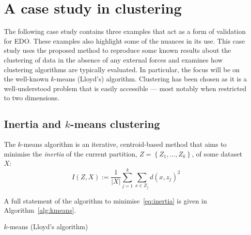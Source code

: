 

\section{A case study in clustering}\label{sec:examples}

The following case study contains three examples that act as a form of
validation for EDO. These examples also highlight some of the nuances in its
use. This case study uses the proposed method to reproduce some known results
about the clustering of data in the absence of any external forces and examines
how clustering algorithms are typically evaluated. In particular, the focus will
be on the well-known \(k\)-means (Lloyd's) algorithm. Clustering has been chosen
as it is a well-understood problem that is easily accessible --- most notably
when restricted to two dimensions.

\subsection{Inertia and \(k\)-means clustering}\label{subsec:inertia}

The \(k\)-means algorithm is an iterative, centroid-based method that aims to
minimise the \emph{inertia} of the current partition, \(Z = \left\{Z_1, \ldots,
Z_k\right\}\), of some dataset \(X\):
\begin{equation}
    I(Z, X) := \frac{1}{|X|} \sum_{j=1}^{k} \sum_{x \in Z_j} {d(x, z_j)}^2
    \label{eq:inertia}
\end{equation}

A full statement of the algorithm to minimise~\eqref{eq:inertia} is given in
Algorithm~\ref{alg:kmeans}.

\balg%

\caption{\(k\)-means (Lloyd's algorithm)}\label{alg:kmeans}
\ealg%

